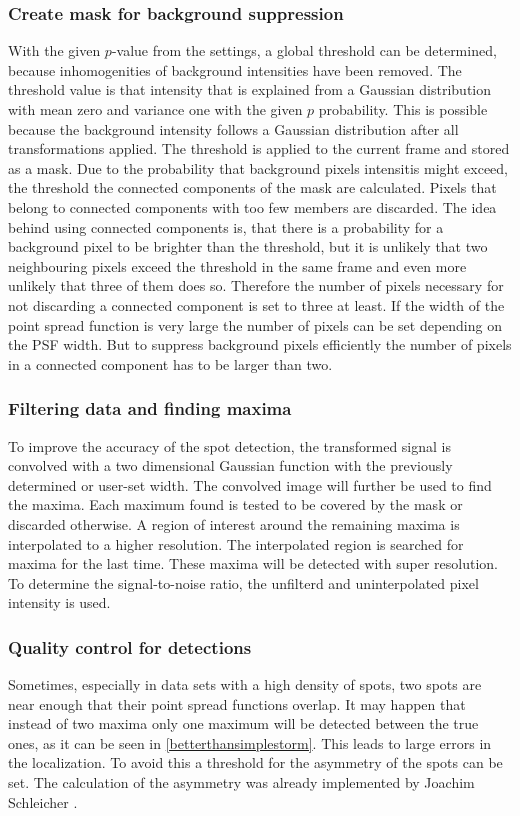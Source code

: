 \subsubsection{Create mask for background suppression}
With the given $p$-value from the settings, a global threshold can be determined, because inhomogenities of background intensities have been removed. The threshold value is that intensity that is explained from a Gaussian distribution with mean zero and variance one with the given $p$ probability. This is possible because the background intensity follows a Gaussian distribution after all transformations applied.\newline
The threshold is applied to the current frame and stored as a mask. Due to the probability that background pixels intensitis might exceed, the threshold the connected components of the mask are calculated. Pixels that belong to connected components with too few members are discarded. The idea behind using connected components is, that there is a probability for a background pixel to be brighter than the threshold, but it is unlikely that two neighbouring pixels exceed the threshold in the same frame and even more unlikely that three of them does so. Therefore the number of pixels necessary for not discarding a connected component is set to three at least. If the width of the point spread function is very large the number of pixels can be set depending on the PSF width. But to suppress background pixels efficiently the number of pixels in a connected component has to be larger than two.
\subsubsection{Filtering data and finding maxima}
To improve the accuracy of the spot detection, the transformed signal is convolved with a two dimensional Gaussian function with the previously determined or user-set width. The convolved image will further be used to find the maxima. Each maximum found is tested to be covered by the mask or discarded otherwise. A region of interest around the remaining maxima is interpolated to a higher resolution. The interpolated region is searched for maxima for the last time. These maxima will be detected with super resolution.\\
To determine the signal-to-noise ratio, the unfilterd and uninterpolated pixel intensity is used.

\subsubsection{Quality control for detections}
Sometimes, especially in data sets with a high density of spots, two spots are near enough that their point spread functions overlap. It may happen that instead of two maxima only one maximum will be detected between the true ones, as it can be seen in \ref{betterthansimplestorm}. This leads to large errors in the localization. To avoid this a threshold for the asymmetry of the spots can be set.\newline
The calculation of the asymmetry was already implemented by Joachim Schleicher \cite{MAJoachim}.


